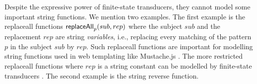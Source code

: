 
Despite the expressive power of finite-state transducers, 
they cannot model some important string functions. We mention two examples. The first 
example is 
the 
replaceall functions $\mathsf{replaceAll}_p(sub,rep)$ where the subject $sub$ and the replacement 
$rep$ are string \emph{variables}, i.e., 
replacing every matching of the pattern $p$ in the subject $sub$ by $rep$.
Such replaceall
functions are important \cite{CCHLW18} for modelling string functions used in 
web 
templating like Mustache.js \cite{Mustache}. The more restricted replaceall
functions where $rep$ is a string constant can be modelled by finite-state  
transducers \cite{LB16}.
The second example is the string reverse function.



%
%


